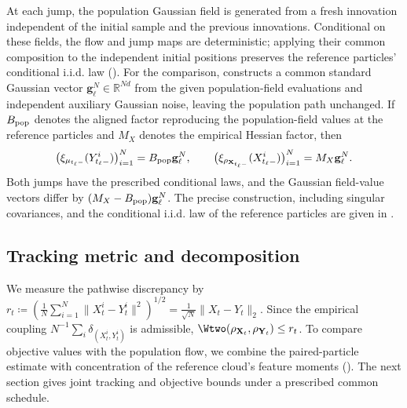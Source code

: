 At each jump, the population Gaussian field is generated from a fresh
innovation independent of the initial sample and the previous innovations.
Conditional on these fields, the flow and jump maps are deterministic;
applying their common composition to the independent initial positions
preserves the reference particles' conditional i.i.d. law
().
For the comparison,  constructs a common
standard Gaussian vector \(\mathbf g_\ell^N\in\mathbb R^{Nd}\) from the given
population-field evaluations and independent auxiliary Gaussian noise,
leaving the population path unchanged. If
\(B_{\rm pop}\) denotes the aligned factor reproducing the population-field
values at the reference particles and \(M_X\) denotes the empirical Hessian
factor, then
\[
    \bigl(\xi_{\mu_{t_\ell-}}(Y^i_{t_\ell-})\bigr)_{i=1}^N
    =B_{\rm pop}\mathbf g_\ell^N,
    \qquad
    \bigl(\xi_{\rho_{\mathbf X_{t_\ell-}}}(X^i_{t_\ell-})\bigr)_{i=1}^N
    =M_X\mathbf g_\ell^N.
\]
Both jumps have the prescribed conditional laws, and the Gaussian
field-value vectors differ by \((M_X-B_{\rm pop})\mathbf g_\ell^N\).
The precise construction, including
singular covariances, and the conditional i.i.d. law of the reference particles
are given in
.

\subsection{Tracking metric and decomposition}
\label{subsec:tracking-metric}

We measure the pathwise discrepancy by
$r_t
    \coloneq 
    \left(\frac1N\sum_{i=1}^N \|X^i_t-Y^i_t\|^2\right)^{1/2}
    =
    \frac1{\sqrt N}\|X_t-Y_t\|_2.
    \label{eq:tracking-metric}
$
Since the empirical coupling \(N^{-1}\sum_i\delta_{(X^i_t,Y^i_t)}\) is admissible, $\Wtwo(\rho_{\mathbf X_t},\rho_{\mathbf Y_t})\le r_t$.
To compare objective values with the population flow, we combine the
paired-particle estimate with concentration of the reference cloud's feature
moments ().
The next section gives joint tracking and objective bounds under a prescribed
common schedule.
